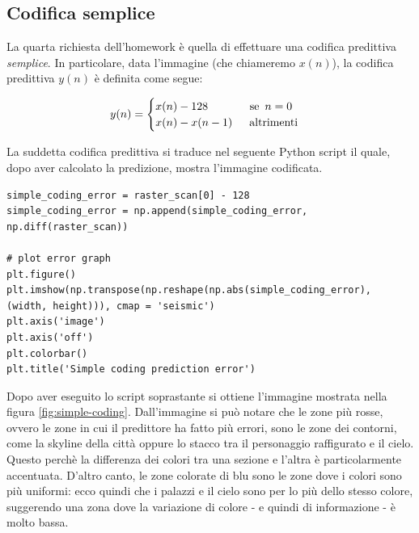 \vspace{15px}\subsection{Codifica semplice}\label{simple-coding}
La quarta richiesta dell'homework è quella di effettuare una codifica predittiva \textsl{semplice}. In particolare, data l'immagine (che chiameremo $x(n)$), la codifica predittiva $y(n)$ è definita come segue:

\begin{gather*}
    y(n) = 
    \begin{cases}
        x(n) - 128 \hspace{37px} \text{se } \, n = 0 \\
        x(n) - x(n - 1) \hspace{15px} \text{altrimenti}\\
    \end{cases}
\end{gather*}

\noindent La suddetta codifica predittiva si traduce nel seguente Python script il quale, dopo aver calcolato la predizione, mostra l'immagine codificata.

\begin{lstlisting}
simple_coding_error = raster_scan[0] - 128
simple_coding_error = np.append(simple_coding_error, np.diff(raster_scan))

# plot error graph
plt.figure()
plt.imshow(np.transpose(np.reshape(np.abs(simple_coding_error), (width, height))), cmap = 'seismic')
plt.axis('image')
plt.axis('off')
plt.colorbar()
plt.title('Simple coding prediction error')
\end{lstlisting}

\noindent Dopo aver eseguito lo script soprastante si ottiene l'immagine mostrata nella figura \ref{fig:simple-coding}. Dall'immagine si può notare che le zone più rosse, ovvero le zone in cui il predittore ha fatto più errori, sono le zone dei contorni, come la skyline della città oppure lo stacco tra il personaggio raffigurato e il cielo. Questo perchè la differenza dei colori tra una sezione e l'altra è particolarmente accentuata. D'altro canto, le zone colorate di blu sono le zone dove i colori sono più uniformi: ecco quindi che i palazzi e il cielo sono per lo più dello stesso colore, suggerendo una zona dove la variazione di colore - e quindi di informazione - è molto bassa.

